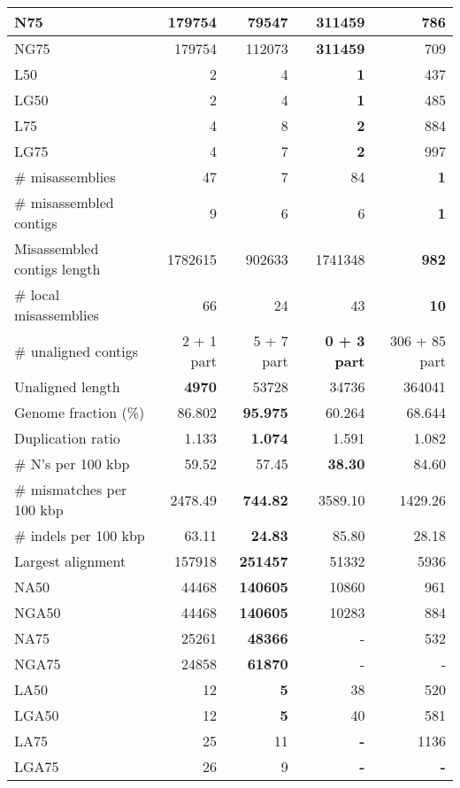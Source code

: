 \documentclass[12pt,a4paper]{article}
\begin{document}
\begin{table}[ht]
\begin{center}
\begin{tabular}{|l*{4}{|r}|}
N75 & 179754 & 79547 & {\bf 311459} & 786 \\ \hline
NG75 & 179754 & 112073 & {\bf 311459} & 709 \\ \hline
L50 & 2 & 4 & {\bf 1} & 437 \\ \hline
LG50 & 2 & 4 & {\bf 1} & 485 \\ \hline
L75 & 4 & 8 & {\bf 2} & 884 \\ \hline
LG75 & 4 & 7 & {\bf 2} & 997 \\ \hline
\# misassemblies & 47 & 7 & 84 & {\bf 1} \\ \hline
\# misassembled contigs & 9 & 6 & 6 & {\bf 1} \\ \hline
Misassembled contigs length & 1782615 & 902633 & 1741348 & {\bf 982} \\ \hline
\# local misassemblies & 66 & 24 & 43 & {\bf 10} \\ \hline
\# unaligned contigs & 2 + 1 part & 5 + 7 part & {\bf 0 + 3 part} & 306 + 85 part \\ \hline
Unaligned length & {\bf 4970} & 53728 & 34736 & 364041 \\ \hline
Genome fraction (\%) & 86.802 & {\bf 95.975} & 60.264 & 68.644 \\ \hline
Duplication ratio & 1.133 & {\bf 1.074} & 1.591 & 1.082 \\ \hline
\# N's per 100 kbp & 59.52 & 57.45 & {\bf 38.30} & 84.60 \\ \hline
\# mismatches per 100 kbp & 2478.49 & {\bf 744.82} & 3589.10 & 1429.26 \\ \hline
\# indels per 100 kbp & 63.11 & {\bf 24.83} & 85.80 & 28.18 \\ \hline
Largest alignment & 157918 & {\bf 251457} & 51332 & 5936 \\ \hline
NA50 & 44468 & {\bf 140605} & 10860 & 961 \\ \hline
NGA50 & 44468 & {\bf 140605} & 10283 & 884 \\ \hline
NA75 & 25261 & {\bf 48366} & - & 532 \\ \hline
NGA75 & 24858 & {\bf 61870} & - & - \\ \hline
LA50 & 12 & {\bf 5} & 38 & 520 \\ \hline
LGA50 & 12 & {\bf 5} & 40 & 581 \\ \hline
LA75 & 25 & 11 & {\bf -} & 1136 \\ \hline
LGA75 & 26 & 9 & {\bf -} & {\bf -} \\ \hline
\end{tabular}
\end{center}
\end{table}
\end{document}
